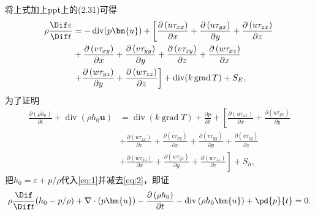 \documentclass[12pt]{article}
\begin{document}
将上式加上ppt上的(2.31)可得
\begin{equation}
	\begin{aligned}
	\rho \frac{\Dif \varepsilon}{\Dif t} &=-\operatorname{div}(p \bm{u})+\left[\frac{\partial\left(u \tau_{x x}\right)}{\partial x}+\frac{\partial\left(u \tau_{y x}\right)}{\partial y}+\frac{\partial\left(u \tau_{z x}\right)}{\partial z}\right.\\
	&+\frac{\partial\left(v \tau_{x y}\right)}{\partial x}+\frac{\partial\left(v \tau_{y y}\right)}{\partial y}+\frac{\partial\left(v \tau_{z y}\right)}{\partial z}+\frac{\partial\left(w \tau_{x z}\right)}{\partial x} \\
	&\left.+\frac{\partial\left(w \tau_{y z}\right)}{\partial y}+\frac{\partial\left(w \tau_{z z}\right)}{\partial z}\right]+\operatorname{div}(k \operatorname{grad} T)+S_{E},
	\end{aligned}
	\label{eq:1}
\end{equation}
为了证明
\begin{equation}
	\begin{aligned}
	\frac{\partial\left(\rho h_{0}\right)}{\partial t}+\operatorname{div}\left(\rho h_{0} \bm{u}\right) &=\operatorname{div}(k \operatorname{grad} T)+\frac{\partial p}{\partial t}+\left[\frac{\partial\left(u \tau_{x x}\right)}{\partial x}+\frac{\partial\left(u \tau_{y x}\right)}{\partial y}\right.\\
	&+\frac{\partial\left(u \tau_{z x}\right)}{\partial z}+\frac{\partial\left(v \tau_{x y}\right)}{\partial x}+\frac{\partial\left(v \tau_{y y}\right)}{\partial y}+\frac{\partial\left(v \tau_{z y}\right)}{\partial z} \\
	&\left.+\frac{\partial\left(w \tau_{x z}\right)}{\partial x}+\frac{\partial\left(w \tau_{y z}\right)}{\partial y}+\frac{\partial\left(w \tau_{z z}\right)}{\partial z}\right]+S_{h},
	\end{aligned}
	\label{eq:2}
\end{equation}
把$h_0 = \varepsilon + p/\rho$代入\cref{eq:1}并减去\cref{eq:2}，即证
\begin{equation}
	\rho \frac{\Dif }{\Dif t}(h_0-p/\rho) + \nabla \cdot (p\bm{u}) - \frac{\partial\left(\rho h_{0}\right)}{\partial t} - \operatorname{div}\left(\rho h_{0} \bm{u}\right) + \pd{p}{t} = 0.
\end{equation}
\end{document}
